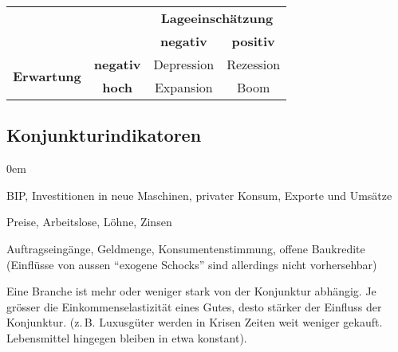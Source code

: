 \begin{center}
\begin{tabular}{|c|c|c|c|}
\cline{3-4}
\multicolumn{2}{c|}{} & \multicolumn{2}{c|}{\textbf{Lageeinschätzung}} \\ \cline{3-4}
\multicolumn{2}{c|}{} & \multicolumn{1}{c|}{\textbf{negativ}} & \multicolumn{1}{c|}{\textbf{positiv}} \\ \cline{1-4}
\multirow{2}{*}{\textbf{Erwartung}} &
\textbf{negativ} &
Depression & 
Rezession \\ \cline{2-4}
	&
\textbf{hoch} & 
Expansion & 
Boom
\\ \cline{1-4}
\end{tabular}
\end{center}

\subsection{Konjunkturindikatoren}
\begin{description}\itemsep0em
	\item [Gleichlaufende] BIP, Investitionen in neue Maschinen, privater Konsum, Exporte und Umsätze
	\item [Nachhinkende] Preise, Arbeitslose, Löhne, Zinsen
	\item [Vorauseilende] Auftragseingänge, Geldmenge, Konsumentenstimmung, offene Baukredite (Einflüsse von aussen \enquote{exogene Schocks} sind allerdings nicht vorhersehbar)
\end{description}

Eine Branche ist mehr oder weniger stark von der Konjunktur abhängig. Je grösser die Einkommenselastizität eines Gutes, desto stärker der Einfluss der Konjunktur. (z.\,B. Luxusgüter werden in Krisen Zeiten weit weniger gekauft. Lebensmittel hingegen bleiben in etwa konstant).

